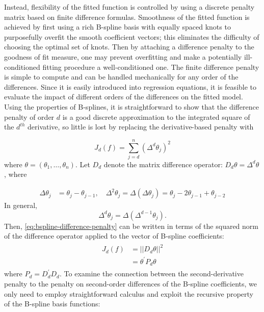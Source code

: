 \documentclass[12pt]{article}
\theoremstyle{definition}
\begin{document}
Instead, flexibility of the fitted function is controlled by using a discrete penalty matrix based on finite difference formulas. Smoothness of the fitted function is achieved by first using a rich B-spline basis with equally spaced knots to purposefully overfit the smooth coefficient vectors; this eliminates the difficulty of choosing the optimal set of knots. Then by attaching a difference penalty to the goodness of fit measure, one may prevent overfitting and make a potentially ill-conditioned fitting procedure a well-conditioned one. The finite difference penalty is simple to compute and can be handled mechanically for any order of the differences. Since it is easily introduced into regression equations, it is feasible to evaluate the impact of different orders of the differences on the fitted model.  Using the properties of B-splines, it is straightforward to show that the difference penalty of order $d$ is a good discrete approximation to the integrated square of the $d^{th}$ derivative, so little is lost by replacing the derivative-based penalty with

\begin{equation} \label{eq:bspline-difference-penalty}
J_d\left( f \right) = \sum_{j=d}^n \left(\Delta^d \theta_j\right)^2
\end{equation} 
\noindent
where $\theta = \left( \theta_1,\dots,\theta_n \right)$. Let $D_d$ denote the matrix difference operator: $D_d\theta = \Delta^d \theta$, where

 \begin{align*}
 \Delta \theta_j &= \theta_j - \theta_{j-1}, \quad  \Delta^2 \theta_j = \Delta\left(\Delta \theta_j\right) = \theta_j - 2\theta_{j-1} + \theta_{j-2}
 \end{align*}
\noindent 
In general,
\begin{equation*}
\Delta^d \theta_j = \Delta\left(\Delta^{d-1} \theta_j \right).
\end{equation*} 
\noindent
Then, \ref{eq:bspline-difference-penalty} can be written in terms of the squared norm of the difference operator applied to the vector of B-spline coefficients:
\begin{align} 
\begin{split} \label{eq:bspline-difference-penalty-vector-form}
J_d\left( f \right) &= \vert \vert D_d\theta \vert \vert^2 \\
&= \theta^\prime P_d \theta
\end{split}
\end{align}
\noindent
where $P_d = D_d^\prime D_d$.  To examine the connection between the second-derivative penalty to the penalty on second-order differences of the B-spline coefficients, we only need to employ straightforward calculus and exploit the recursive property of the B-spline basis functions:
\end{document}
